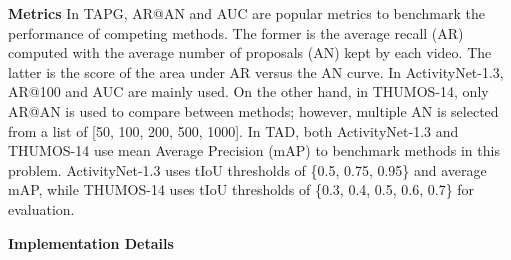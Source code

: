 \documentclass{bmvc2k}
\begin{document}
\begin{table}[t]
\centering
\caption{\textbf{TAPG} comparisons in terms of AR@AN and AUC between our AEI and other SOTA methods on \textbf{ActivityNet-1.3}.}
\vspace*{0.2cm}
\label{activitynet_proposal1}
\end{table}









\noindent
\textbf{Metrics}
\newline 
In TAPG, AR@AN and AUC are popular metrics to benchmark the performance of competing methods. The former is the average recall (AR) computed with the average number of proposals (AN) kept by each video. The latter is the score of the area under AR versus the AN curve. In ActivityNet-1.3, AR@100 and AUC are mainly used. On the other hand, in THUMOS-14, only AR@AN is used to compare between methods; however, multiple AN is selected from a list of [50, 100, 200, 500, 1000].
\newline\indent
In TAD, both ActivityNet-1.3 and THUMOS-14 use mean Average Precision (mAP) to benchmark methods in this problem. ActivityNet-1.3 uses tIoU thresholds of \{0.5, 0.75, 0.95\} and average mAP, while THUMOS-14 uses tIoU thresholds of \{0.3, 0.4, 0.5, 0.6, 0.7\} for evaluation.

\noindent
\textbf{Implementation Details}
\end{document}
